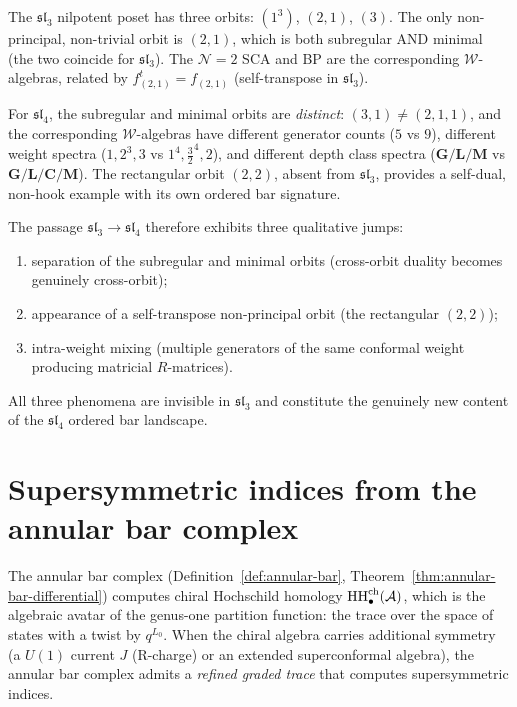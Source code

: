 \begin{remark}
\label{rem:sl3-sl4-comparison}

The $\mathfrak{sl}_3$ nilpotent poset has three orbits:
$(1^3)$, $(2,1)$, $(3)$. The only non-principal,
non-trivial orbit is $(2,1)$, which is both subregular
AND minimal (the two coincide for $\mathfrak{sl}_3$).
The $\mathcal N=2$ SCA and BP are the corresponding
$\mathcal W$-algebras, related by $f_{(2,1)}^t = f_{(2,1)}$
(self-transpose in $\mathfrak{sl}_3$).

For $\mathfrak{sl}_4$, the subregular and minimal orbits
are \emph{distinct}: $(3,1) \neq (2,1,1)$, and the
corresponding $\mathcal W$-algebras have different
generator counts ($5$ vs $9$), different weight spectra
($1,2^3,3$ vs $1^4,\frac32^4,2$), and different depth
class spectra ($\mathbf{G/L/M}$ vs $\mathbf{G/L/C/M}$).
The rectangular orbit $(2,2)$, absent from
$\mathfrak{sl}_3$, provides a self-dual, non-hook
example with its own ordered bar signature.

The passage $\mathfrak{sl}_3 \to \mathfrak{sl}_4$
therefore exhibits three qualitative jumps:
\begin{enumerate}[label=(\roman*)]
\item separation of the subregular and minimal orbits
 (cross-orbit duality becomes genuinely cross-orbit);
\item appearance of a self-transpose non-principal orbit
 (the rectangular $(2,2)$);
\item intra-weight mixing (multiple generators of the
 same conformal weight producing matricial
 $R$-matrices).
\end{enumerate}
All three phenomena are invisible in $\mathfrak{sl}_3$
and constitute the genuinely new content of the
$\mathfrak{sl}_4$ ordered bar landscape.
\end{remark}

\section{Supersymmetric indices from the annular bar complex}
\label{sec:susy-index-annular-bar}

The annular bar complex
(Definition~\ref{def:annular-bar},
Theorem~\ref{thm:annular-bar-differential})
computes chiral Hochschild homology
$\operatorname{HH}_\bullet^{\mathrm{ch}}(\mathcal{A})$, which is the algebraic
avatar of the genus-one partition function: the trace over
the space of states with a twist by $q^{L_0}$.
When the chiral algebra carries additional symmetry (a
$U(1)$ current $J$ (R-charge) or an extended superconformal
algebra), the annular bar complex admits a \emph{refined
graded trace} that computes supersymmetric indices.

